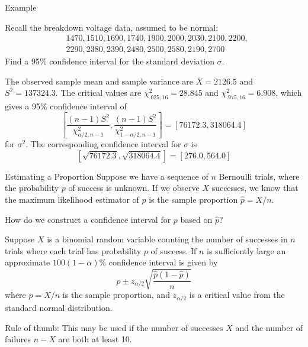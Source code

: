\documentclass[handout]{beamer}
\begin{document}
\begin{frame}{Example}
\begin{block}{}
Recall the breakdown voltage data,  assumed to be normal:
\begin{align*}
&1470, 1510, 1690, 1740, 1900, 2000, 2030, 2100, 2200, \\
& 2290, 2380, 2390, 2480, 2500, 2580, 2190, 2700
\end{align*}
Find a 95\% confidence interval for the standard deviation $\sigma$.
\end{block}

\pause The observed sample mean and sample variance are $\overline X=2126.5$ and $S^2=137324.3$. \pause The critical values are $\chi^2_{.025,16}=28.845$ and $\chi^2_{.975,16}=6.908$, \pause which gives a 95\% confidence interval of
$$\left[\frac{(n-1)S^2}{\chi^2_{\alpha/2,n-1}}, \frac{(n-1)S^2}{\chi^2_{1-\alpha/2,n-1}}\right]
= [76172.3, 318064.4]$$
for $\sigma^2$. \pause The corresponding confidence interval for $\sigma$ is
$$[\sqrt{76172.3}, \sqrt{318064.4}] = [276.0, 564.0]$$

\end{frame}


\begin{frame}{Estimating a Proportion}
Suppose we have a sequence of $n$ Bernoulli trials, where the probability $p$ of success is unknown. If we observe $X$ successes, we know that the maximum likelihood estimator of $p$ is the sample proportion $\hat p=X/n$. 

\vspace{.2cm}\pause How do we construct a confidence interval for $p$ based on $\hat p$?
\pause \begin{block}{}Suppose $X$ is a binomial random variable counting the number of successes in $n$ trials where each trial has probability $p$ of success. If $n$ is sufficiently large an approximate $100(1-\alpha)\%$ confidence interval is given by
$$\hat p \pm z_{\alpha/2}\sqrt{\frac{\hat p(1-\hat p)}n}$$
where $\hat p=X/n$ is the sample proportion, and $z_{\alpha/2}$ is a critical value from the standard normal distribution.
\end{block}
\pause Rule of thumb: This may be used if the number of successes $X$ and the number of failures $n-X$ are both at least 10.
\end{frame}
\end{document}

